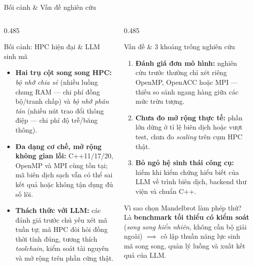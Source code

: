 \documentclass[aspectratio=169,10pt]{beamer}
\begin{document}
\begin{frame}{Bối cảnh \& Vấn đề nghiên cứu}
\begin{columns}[T,totalwidth=\textwidth]
  \begin{column}{0.485\textwidth}
    \begin{bluebox}[height=5.76cm]{Bối cảnh: HPC hiện đại \& LLM sinh mã}
      \begin{itemize}\scriptsize\setlength{\itemsep}{4.5pt}
        \item \textbf{Hai trụ cột song song HPC:} \emph{bộ nhớ chia sẻ} (nhiều luồng chung RAM --- chi phí đồng bộ/tranh chấp) và \emph{bộ nhớ phân tán} (nhiều nút trao đổi thông điệp --- chi phí độ trễ/băng thông).
        \item \textbf{Đa dạng cơ chế, mở rộng không gian lỗi:} C++11/17/20, OpenMP và MPI cùng tồn tại; mã biên dịch sạch vẫn có thể sai kết quả hoặc không tận dụng đủ số lõi.
        \item \textbf{Thách thức với LLM:} các đánh giá trước chủ yếu xét mã tuần tự; mã HPC đòi hỏi đồng thời tính đúng, tương thích \emph{toolchain}, kiểm soát tài nguyên và mở rộng trên phần cứng thật.
      \end{itemize}
    \end{bluebox}
  \end{column}
  \begin{column}{0.485\textwidth}
    \begin{hboxcard}[height=3.62cm]{Vấn đề \& 3 khoảng trống nghiên cứu}
      \begin{enumerate}\scriptsize\setlength{\itemsep}{3.5pt}
        \item \textbf{Đánh giá đơn mô hình:} nghiên cứu trước thường chỉ xét riêng OpenMP, OpenACC hoặc MPI --- thiếu so sánh ngang hàng giữa các mức trừu tượng.
        \item \textbf{Chưa đo mở rộng thực tế:} phần lớn dừng ở tỉ lệ biên dịch hoặc vượt test, chưa đo \emph{scaling} trên cụm HPC thật.
        \item \textbf{Bỏ ngỏ hệ sinh thái công cụ:} hiếm khi kiểm chứng hiểu biết của LLM về trình biên dịch, backend thư viện và chuẩn C++.
      \end{enumerate}
    \end{hboxcard}
    \vspace{0.22cm}
    \begin{bluebox}[height=1.92cm]{Vì sao chọn Mandelbrot làm phép thử?}
      \scriptsize Là \textbf{benchmark tối thiểu có kiểm soát} (\emph{song song hiển nhiên}, không cần bộ giải ngoài) $\implies$ cô lập thuần năng lực sinh mã song song, quản lý luồng và xuất kết quả của LLM.
    \end{bluebox}
  \end{column}
\end{columns}
\end{frame}
\end{document}
